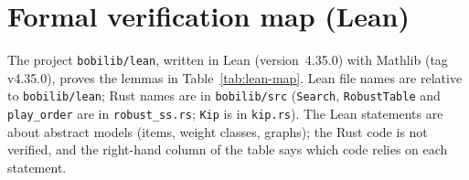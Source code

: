 \section{Formal verification map (Lean)}\label{app:lean-map}

The project \texttt{bobilib/lean}, written in Lean\cite{moura2021lean}
(version~4.35.0) with Mathlib\cite{mathlib2020} (tag v4.35.0), proves the lemmas in
Table~\ref{tab:lean-map}. Lean file names are relative to \texttt{bobilib/lean}; Rust
names are in \texttt{bobilib/src} (\texttt{Search}, \texttt{RobustTable} and
\texttt{play\_order} are in \texttt{robust\_ss.rs}; \texttt{Kip} is in
\texttt{kip.rs}). The Lean statements are about abstract models (items,
weight classes, graphs); the Rust code is not verified, and the right-hand
column of the table says which code relies on each statement.

